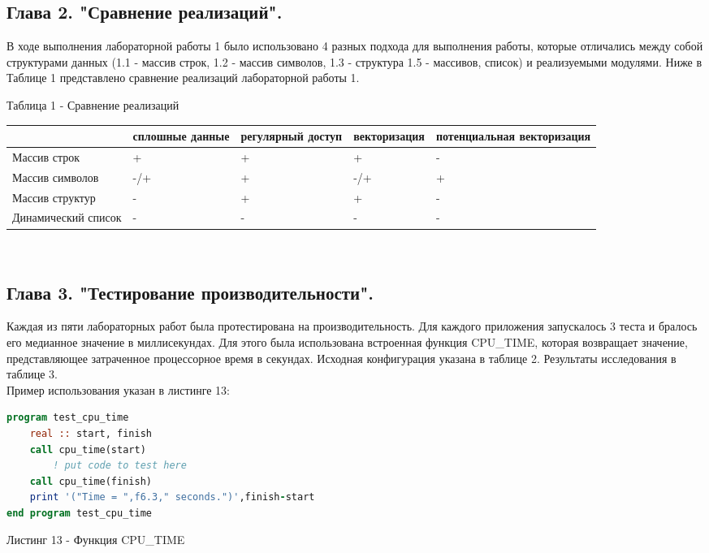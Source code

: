 \documentclass[12pt, a4paper]{report}
\begin{document}
\begin{center}
\section*{Глава 2. "Сравнение реализаций".}
\end{center}

В ходе выполнения лабораторной работы 1 было использовано 4 разных подхода для выполнения работы, которые отличались между собой структурами данных (1.1 - массив строк, 1.2 - массив символов, 1.3 - структура 1.5 - массивов, список) и реализуемыми модулями. Ниже в Таблице 1 представлено сравнение реализаций лабораторной работы 1. 

Таблица 1 - Сравнение реализаций\\
\begin{tabular}{ |p{3.5cm}|p{3cm}|p{3cm}|p{3cm}|p{3cm}|}
\hline
  &сплошные данные & регулярный доступ & векторизация & потенциальная векторизация\\
\hline
Массив строк  & + & + & + & -  \\
\hline
Массив символов  & -/+ & + & -/+ & +   \\
\hline
Массив структур  & - & + & + & -   \\
\hline
Динамический список  &- & - & - & -  \\
\hline
\end{tabular} \\

\newpage

\begin{center}
\section*{Глава 3. "Тестирование производительности".}
\end{center}

Каждая из пяти лабораторных работ была протестирована на производительность. Для каждого приложения запускалось 3 теста и бралось его медианное значение в миллисекундах. Для этого была использована встроенная функция CPU\_TIME, которая возвращает значение, представляющее затраченное процессорное время в секундах. Исходная конфигурация указана в таблице 2. Результаты исследования в таблице 3. \\

Пример использования указан в листинге 13:
\begin{lstlisting}[language=Fortran]
program test_cpu_time
    real :: start, finish
    call cpu_time(start)
        ! put code to test here
    call cpu_time(finish)
    print '("Time = ",f6.3," seconds.")',finish-start
end program test_cpu_time
\end{lstlisting}
\begin{center}
Листинг 13 - Функция CPU\_TIME
\end{center} 
\end{document}
